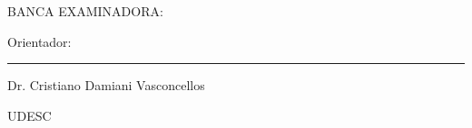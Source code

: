 

%
% 
%
\begin{folhadeaprovacao}



	\begin{center}
		{\selectfont\MakeTextUppercase{\normalsize\imprimirautor}}
	\end{center}
    \vfill
    
	\vfill
	\begin{center}
		{\selectfont\MakeTextUppercase{\imprimirtitulo}}
	\end{center}
	\vfill

    
%


\vfill
        
	\begin{center}
		{\selectfont BANCA EXAMINADORA: }
		\vspace*{1.75cm}
	\end{center}

	{Orientador:}

	\begin{center}
		\begin{minipage}{8.75cm}
			\begin{flushleft}
				\rule{8.75cm}{0.1mm}

				Dr. Cristiano Damiani Vasconcellos \par
				UDESC
			\end{flushleft}
		\end{minipage}
	\end{center}
	
	\vspace*{\baselineskip}


\end{folhadeaprovacao}
